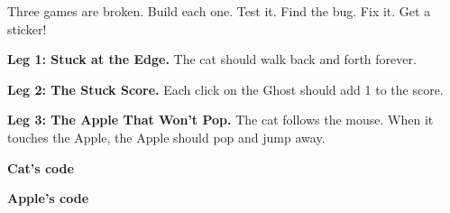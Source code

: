 \begin{exercise}
Three games are broken. Build each one. Test it. Find the bug. Fix it. Get a sticker!

\textbf{Leg 1: Stuck at the Edge.} The cat should walk back and forth forever.
\begin{center}
\begin{scratch}[scale=0.8]
\end{scratch}
\end{center}

\textbf{Leg 2: The Stuck Score.} Each click on the Ghost should add 1 to the score.
\begin{center}
\begin{scratch}[scale=0.8]
\end{scratch}
\qquad
\begin{scratch}[scale=0.8]
\end{scratch}
\end{center}

\textbf{Leg 3: The Apple That Won't Pop.} The cat follows the mouse. When it touches the Apple, the Apple should pop and jump away.
\begin{center}
\begin{minipage}[t]{0.4\linewidth}\centering
\textbf{Cat's code}\par\smallskip
\begin{scratch}[scale=0.8]
\end{scratch}
\end{minipage}\hfill
\begin{minipage}[t]{0.55\linewidth}\centering
\textbf{Apple's code}\par\smallskip
\begin{scratch}[scale=0.8]
\end{scratch}
\end{minipage}
\end{center}
\end{exercise}


